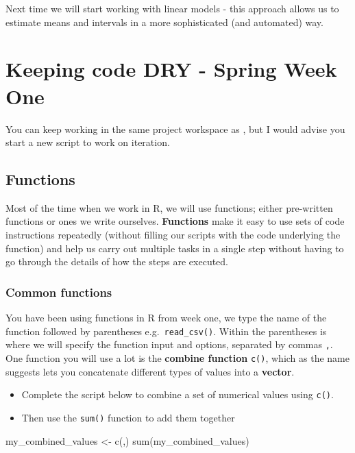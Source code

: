 \documentclass[
]{book}
\newenvironment{Shaded}{\begin{snugshade}}{\end{snugshade}}
\newcommand{\FunctionTok}[1]{\textcolor[rgb]{0.00,0.00,0.00}{#1}}
\newcommand{\NormalTok}[1]{#1}
\newcommand{\OtherTok}[1]{\textcolor[rgb]{0.56,0.35,0.01}{#1}}
\begin{document}
Next time we will start working with linear models - this approach allows us to estimate means and intervals in a more sophisticated (and automated) way.

\hypertarget{keeping-code-dry---spring-week-one}{%
\chapter{Keeping code DRY - Spring Week One}\label{keeping-code-dry---spring-week-one}}

You can keep working in the same project workspace as \citet{ref-Estimates}, but I would advise you start a new script to work on iteration.

\hypertarget{functions-1}{%
\section{Functions}\label{functions-1}}

Most of the time when we work in R, we will use functions; either pre-written functions or ones we write ourselves. \textbf{Functions} make it easy to use sets of code instructions repeatedly (without filling our scripts with the code underlying the function) and help us carry out multiple tasks in a single step without having to go through the details of how the steps are executed.

\hypertarget{common-functions}{%
\subsection{Common functions}\label{common-functions}}

You have been using functions in R from week one, we type the name of the function followed by parentheses e.g.~\texttt{read\_csv()}. Within the parentheses is where we will specify the function input and options, separated by commas \texttt{,}. One function you will use a lot is the \textbf{combine function} \texttt{c()}, which as the name suggests lets you concatenate different types of values into a \textbf{vector}.

\begin{itemize}
\item
  Complete the script below to combine a set of numerical values using \texttt{c()}.
\item
  Then use the \texttt{sum()} function to add them together
\end{itemize}

\begin{Shaded}
\begin{Highlighting}[]
\NormalTok{my\_combined\_values }\OtherTok{\textless{}{-}} \FunctionTok{c}\NormalTok{(,) }
\FunctionTok{sum}\NormalTok{(my\_combined\_values)}
\end{Highlighting}
\end{Shaded}
\end{document}
